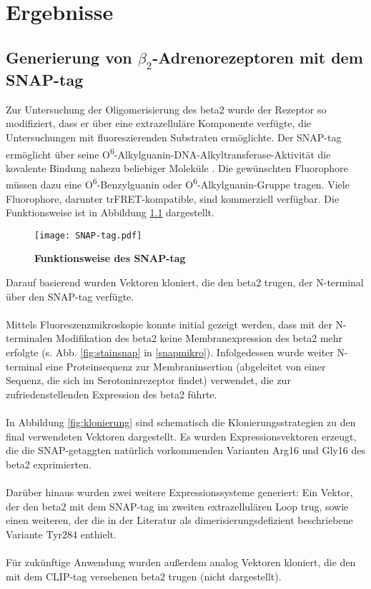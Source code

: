 \chapter{Ergebnisse} \label{chapter:ergebnisse}
\section{Generierung von $\beta_2$-Adrenorezeptoren mit dem SNAP-tag} \label{klonierung}
Zur Untersuchung der Oligomerisierung des \gls{beta2} wurde der Rezeptor so modifiziert, dass er über eine extrazelluläre Komponente verfügte, die Untersuchungen mit fluoreszierenden Substraten ermöglichte. Der SNAP-tag ermöglicht über seine O\textsuperscript{6}-Alkylguanin-DNA-Alkyltransferase-Aktivität die kovalente Bindung nahezu beliebiger Moleküle \parencite{Gronemeyer2006}. Die gewünschten Fluorophore müssen dazu eine O\textsuperscript{6}-Benzylguanin oder O\textsuperscript{6}-Alkylguanin-Gruppe tragen. Viele Fluorophore, darunter trFRET-kompatible, sind kommerziell verfügbar. Die Funktionsweise ist in Abbildung \ref{fig:snap-tag} dargestellt.

\begin{figure}[htp]
    \texttt{[image: SNAP-tag.pdf]}
    \caption{\textbf{Funktionsweise des SNAP-tag}}
    \label{fig:snap-tag}
\end{figure}

Darauf basierend wurden Vektoren kloniert, die den \gls{beta2} trugen, der N-terminal über den SNAP-tag verfügte. 
\\ \\
Mittels Fluoreszenzmikroskopie konnte initial gezeigt werden, dass mit der N-terminalen Modifikation des \gls{beta2} keine Membranexpression des \gls{beta2} mehr erfolgte (s. Abb. \ref{fig:stainsnap} in \ref{snapmikro}). Infolgedessen wurde weiter N-terminal eine Proteinsequenz zur Membraninsertion (abgeleitet von einer Sequenz, die sich im Serotoninrezeptor findet) verwendet, die zur zufriedenstellenden Expression des \gls{beta2} führte. 
\\ \\
In Abbildung \ref{fig:klonierung} sind schematisch die Klonierungsstrategien zu den final verwendeten Vektoren dargestellt. Es wurden Expressionsvektoren erzeugt, die die SNAP-getaggten natürlich vorkommenden Varianten Arg16 und Gly16 des \gls{beta2} exprimierten.
\\ \\ 
Darüber hinaus wurden zwei weitere Expressionssysteme generiert: Ein Vektor, der den \gls{beta2} mit dem SNAP-tag im zweiten extrazellulären Loop trug, sowie einen weiteren, der die in der Literatur als dimerisierungsdefizient beschriebene Variante Tyr284 \parencite{Salahpour2004} enthielt.
\\ \\
Für zukünftige Anwendung wurden außerdem analog Vektoren kloniert, die den mit dem CLIP-tag versehenen \gls{beta2} trugen (nicht dargestellt). 

